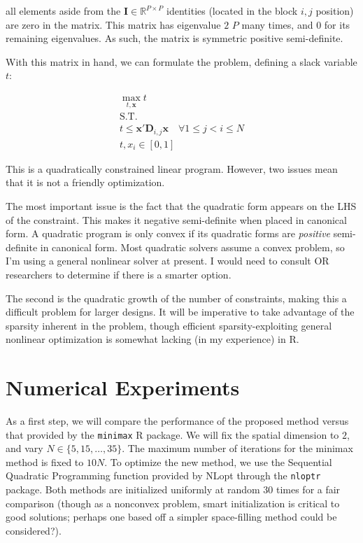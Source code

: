 \documentclass[]{article}
\begin{document}
all elements aside from the $\mathbf{I} \in \mathbb{R}^{P\times P}$ identities (located in the block $i,j$ position) are zero in the matrix. This matrix has eigenvalue $2$ $P$ many times, and $0$ for its remaining eigenvalues. As such, the matrix is symmetric positive semi-definite.

With this matrix in hand, we can formulate the problem, defining a slack variable $t$:

\begin{align*}
	\max_{t, \mathbf{x}} t\\
	\textrm{S.T.}\\
	t \leq \mathbf{x}'\mathbf{D}_{i,j}\mathbf{x} \hspace{1em} \forall 1 \leq j < i \leq N\\
	t,x_i \in [0,1]
\end{align*}

This is a quadratically constrained linear program. However, two issues mean that it is not a friendly optimization. 

The most important issue is the fact that the quadratic form appears on the LHS of the constraint. This makes it negative semi-definite when placed in canonical form. A quadratic program is only convex if its quadratic forms are \textit{positive} semi-definite in canonical form. Most quadratic solvers assume a convex problem, so I'm using a general nonlinear solver at present. I would need to consult OR researchers to determine if there is a smarter option.

The second is the quadratic growth of the number of constraints, making this a difficult problem for larger designs. It will be imperative to take advantage of the sparsity inherent in the problem, though efficient sparsity-exploiting general nonlinear optimization is somewhat lacking (in my experience) in R.

\section{Numerical Experiments}

As a first step, we will compare the performance of the proposed method versus that provided by the \texttt{minimax} R package. We will fix the spatial dimension to $2$, and vary $N \in \{5, 15, \ldots, 35\}$. The maximum number of iterations for the minimax method is fixed to $10N$. To optimize the new method, we use the Sequential Quadratic Programming function provided by NLopt through the \texttt{nloptr} package. Both methods are initialized uniformly at random 30 times  for a fair comparison (though as a nonconvex problem, smart initialization is critical to good solutions; perhaps one based off a simpler space-filling method could be considered?).
\end{document}
